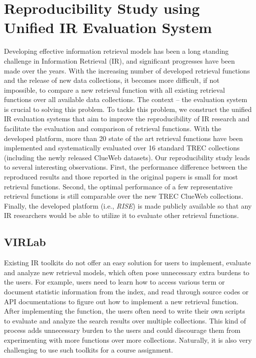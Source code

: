 %
%
\chapter{Reproducibility Study using Unified IR Evaluation System}

Developing effective information retrieval models has been a 
long standing challenge in Information Retrieval (IR), and significant 
progresses have been made over the years. With the increasing 
number of developed retrieval functions and the release of 
new data collections, it becomes more difficult, if not impossible, 
to compare a new retrieval function with all existing retrieval 
functions over all available data collections.  
The context -- the evaluation system is crucial to solving this problem.
To tackle this problem, we construct the unified IR evaluation systems 
that aim to improve the reproducibility of IR research
and facilitate the evaluation and comparison of retrieval functions. 
With the developed platform, more than 20 state of the art 
retrieval functions have been implemented and systematically 
evaluated over 16 standard TREC collections (including the newly 
released ClueWeb datasets). Our reproducibility study leads to 
several interesting observations. First, the performance difference
between the reproduced results and those reported in the original 
papers is small for most retrieval functions.  Second, the optimal 
performance of a few representative retrieval functions is still 
comparable over the new TREC ClueWeb collections. 
Finally, the developed platform (i.e., {\em RISE}) is made publicly 
available so that any IR researchers would be able to utilize 
it to evaluate other retrieval functions. 


\section{VIRLab}

Existing IR toolkits do not offer an easy solution for users 
to implement, evaluate and analyze new retrieval models, 
which often pose unnecessary extra burdens to the users. 
For example, users need to learn how to access various term 
or document statistic information from the index, and read 
through source codes or API documentations to figure out how 
to implement a new retrieval function. After implementing the 
function, the users often need to write their own scripts to 
evaluate and analyze the search results over multiple collections. 
This kind of process adds unnecessary burden to the users and 
could discourage them from experimenting with more functions 
over more collections. Naturally, it is also very challenging 
to use such toolkits for a course assignment.

